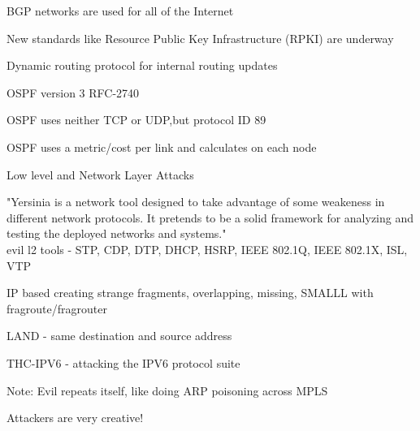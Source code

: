 \documentclass[Screen16to9,17pt]{foils}
\begin{document}

\begin{list2}
\item BGP networks are used for all of the Internet
\item New standards like Resource Public Key Infrastructure (RPKI) are underway
\end{list2}




\begin{list2}
\item Dynamic routing protocol for internal routing updates
\item OSPF version 3 RFC-2740
\item OSPF uses neither TCP or UDP,but protocol ID 89
\item OSPF uses a metric/cost per link and calculates on each node
\item {}
\end{list2}



\begin{list1}
\item Low level and Network Layer Attacks
\begin{list2}
\item "Yersinia is a network tool designed to take advantage of some weakeness in different network protocols. It pretends to be a solid framework for analyzing and testing the deployed networks and systems."\\
evil l2 tools - STP, CDP, DTP, DHCP, HSRP, IEEE 802.1Q, IEEE 802.1X, ISL, VTP\\
\item IP based creating strange fragments, overlapping, missing, SMALLL with fragroute/fragrouter
\item LAND - same destination and source address
\item THC-IPV6 - attacking the IPV6 protocol suite
\end{list2}
\item Note: Evil repeats itself, like doing ARP poisoning across MPLS
\end{list1}

\vskip 1cm
\centerline{\Large Attackers are very creative!}
\end{document}
